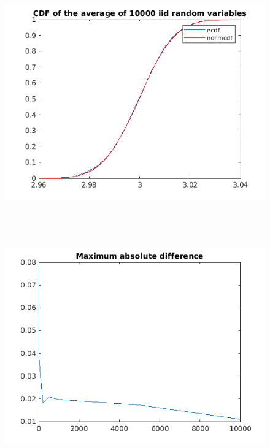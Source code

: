\documentclass{article}
\begin{document}
\begin{figure}[H]
    {\includegraphics[width =13cm, height=10cm]{3.png}}
    \end{figure}
    \begin{figure}[H]
    {\includegraphics[width =13cm, height=10cm]{4.png}}
    \end{figure}
\end{document}
